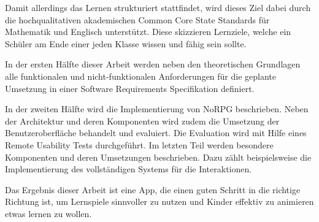 	Damit allerdings das Lernen strukturiert stattfindet, wird dieses Ziel dabei durch die hochqualitativen akademischen Common Core State Standards für Mathematik und Englisch unterstützt. Diese skizzieren Lernziele, welche ein Schüler am Ende einer jeden Klasse wissen und fähig sein sollte.
	
	In der ersten Hälfte dieser Arbeit werden neben den theoretischen Grundlagen alle funktionalen und nicht-funktionalen Anforderungen für die geplante Umsetzung in einer Software Requirements Specifikation definiert.
	
	In der zweiten Hälfte wird die Implementierung von NoRPG beschrieben. Neben der Architektur und deren Komponenten wird zudem die Umsetzung der Benutzeroberfläche behandelt und evaluiert. Die Evaluation wird mit Hilfe eines Remote Usability Tests durchgeführt. Im letzten Teil werden besondere Komponenten und deren Umsetzungen beschrieben. Dazu zählt beispielsweise die Implementierung des vollständigen Systems für die Interaktionen.
	
	Das Ergebnis dieser Arbeit ist eine App, die einen guten Schritt in die richtige Richtung ist, um Lernspiele sinnvoller zu nutzen und Kinder effektiv zu animieren etwas lernen zu wollen. 